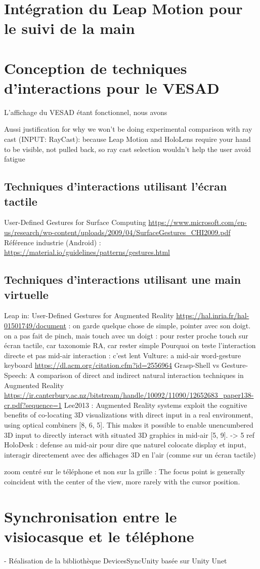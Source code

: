 \section{Intégration du Leap Motion pour le suivi de la main}


\section{Conception de techniques d'interactions pour le VESAD}
L'affichage du VESAD étant fonctionnel, nous avons 

Aussi justification for why we won’t be doing experimental comparison with ray cast (INPUT: RayCast): because Leap Motion and HoloLens require your hand to be visible, not pulled back, so ray cast selection wouldn’t help the user avoid fatigue

\subsection{Techniques d'interactions utilisant l'écran tactile}
User-Defined Gestures for Surface Computing \url{https://www.microsoft.com/en-us/research/wp-content/uploads/2009/04/SurfaceGestures_CHI2009.pdf}
Référence industrie (Android) : \url{https://material.io/guidelines/patterns/gestures.html}

\subsection{Techniques d'interactions utilisant une main virtuelle}
Leap in:
User-Defined Gestures for Augmented Reality \url{https://hal.inria.fr/hal-01501749/document} : on garde quelque chose de simple, pointer avec son doigt. on a pas fait de pinch, mais touch avec un doigt : pour rester proche touch sur écran tactile, car taxonomie RA, car rester simple
Pourquoi on teste l'interaction directe et pas mid-air interaction : c'est lent Vulture: a mid-air word-gesture keyboard \url{https://dl.acm.org/citation.cfm?id=2556964}
Grasp-Shell vs Gesture-Speech: A comparison of direct and indirect natural interaction
techniques in Augmented Reality \url{https://ir.canterbury.ac.nz/bitstream/handle/10092/11090/12652683_paper138-cr.pdf?sequence=1}
Lee2013 : Augmented Reality systems exploit the cognitive benefits of co-locating 3D visualizations with direct input in a real environment, using optical combiners [8, 6, 5]. This makes it possible to enable unencumbered 3D input to directly interact with situated 3D graphics in mid-air [5, 9]. -> 5 ref HoloDesk : defense au mid-air pour dire que naturel colocate display et input, interagir directement avec des affichages 3D en l'air (comme sur un écran tactile)

zoom centré sur le téléphone et non sur la grille : The focus point is generally coincident with the center of the view, more rarely with the cursor position. \cite{Guiard2004}


\section{Synchronisation entre le visiocasque et le téléphone}

- Réalisation de la bibliothèque DevicesSyncUnity basée sur Unity Unet